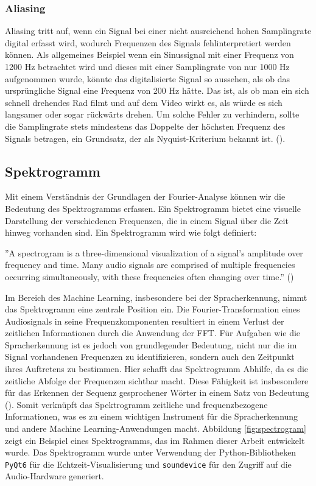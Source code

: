 \documentclass[11pt,a4paper]{article}
\begin{document}
\subsubsection{Aliasing}
Aliasing tritt auf, wenn ein Signal bei einer nicht ausreichend hohen Samplingrate digital erfasst
wird, wodurch Frequenzen des Signals fehlinterpretiert werden können. Als allgemeines Beispiel wenn
ein Sinussignal mit einer Frequenz von 1200 Hz betrachtet wird und dieses mit einer Samplingrate
von nur 1000 Hz aufgenommen wurde, könnte das digitalisierte Signal so aussehen, als ob das
ursprüngliche Signal eine Frequenz von 200 Hz hätte. Das ist, als ob man ein sich schnell
drehendes Rad filmt und auf dem Video wirkt es, als würde es sich langsamer oder sogar rückwärts
drehen. Um solche Fehler zu verhindern, sollte die Samplingrate stets mindestens das
Doppelte der höchsten Frequenz des Signals betragen, ein Grundsatz, der als Nyquist-Kriterium
bekannt ist. (\cite[]{weitz2023fourier}).

\subsection{Spektrogramm}
Mit einem Verständnis der Grundlagen der Fourier-Analyse können wir die Bedeutung des Spektrogramms
erfassen. Ein Spektrogramm bietet eine visuelle Darstellung der verschiedenen Frequenzen, die in
einem Signal über die Zeit hinweg vorhanden sind. Ein Spektrogramm wird wie folgt definiert:

\begin{displayquote}
	''A spectrogram is a three-dimensional visualization of a signal’s amplitude over frequency and
	time. Many audio signals are comprised of multiple frequencies occurring simultaneously, with
	these frequencies often changing over time.'' (\cite[Chapter~15.2.1]{tarr2018hackaudio})
\end{displayquote}

\noindent
Im Bereich des Machine Learning, insbesondere bei der Spracherkennung, nimmt das Spektrogramm eine
zentrale Position ein. Die Fourier-Transformation eines Audiosignals in seine Frequenzkomponenten
resultiert in einem Verlust der zeitlichen Informationen durch die Anwendung der FFT. Für Aufgaben
wie die Spracherkennung ist es jedoch von grundlegender Bedeutung, nicht nur die im Signal
vorhandenen Frequenzen zu identifizieren, sondern auch den Zeitpunkt ihres Auftretens zu bestimmen.
Hier schafft das Spektrogramm Abhilfe, da es die zeitliche Abfolge der Frequenzen sichtbar macht.
Diese Fähigkeit ist insbesondere für das Erkennen der Sequenz gesprochener Wörter in einem Satz von
Bedeutung (\cite{chaudhary2020}). Somit verknüpft das Spektrogramm zeitliche und frequenzbezogene
Informationen, was es zu einem wichtigen Instrument für die Spracherkennung und andere Machine
Learning-Anwendungen macht. Abbildung \ref{fig:spectrogram} zeigt ein Beispiel eines Spektrogramms,
das im Rahmen dieser Arbeit entwickelt wurde. Das Spektrogramm wurde unter Verwendung der
Python-Bibliotheken \texttt{PyQt6} für die Echtzeit-Visualisierung und \texttt{soundevice} für den
Zugriff auf die Audio-Hardware generiert.
\end{document}
